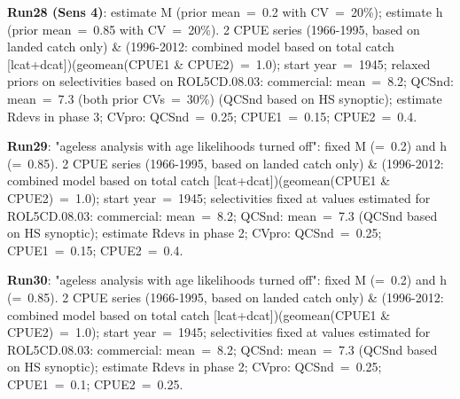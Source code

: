 {\bf Run28 (Sens 4)}: estimate M (prior mean~=~0.2 with CV~=~20\%); estimate h (prior mean~=~0.85 with CV~=~20\%). 2 CPUE series (1966-1995, based on landed catch only) \& (1996-2012: combined model based on total catch [lcat+dcat])(geomean(CPUE1 \& CPUE2)~=~1.0); start year~=~1945; relaxed priors on selectivities based on ROL5CD.08.03: commercial: mean~=~8.2; QCSnd: mean~=~7.3 (both prior CVs~=~30\%) (QCSnd based on HS synoptic); estimate Rdevs in phase 3; CVpro: QCSnd~=~0.25; CPUE1~=~0.15; CPUE2~=~0.4. \newline

{\bf Run29}: "ageless analysis with age likelihoods turned off": fixed M (=~0.2) and h (=~0.85). 2 CPUE series (1966-1995, based on landed catch only) \& (1996-2012: combined model based on total catch [lcat+dcat])(geomean(CPUE1 \& CPUE2)~=~1.0); start year~=~1945; selectivities fixed at values estimated for ROL5CD.08.03: commercial: mean~=~8.2; QCSnd: mean~=~7.3 (QCSnd based on HS synoptic); estimate Rdevs in phase 2; CVpro: QCSnd~=~0.25; CPUE1~=~0.15; CPUE2~=~0.4. \newline

{\bf Run30}: "ageless analysis with age likelihoods turned off": fixed M (=~0.2) and h (=~0.85). 2 CPUE series (1966-1995, based on landed catch only) \& (1996-2012: combined model based on total catch [lcat+dcat])(geomean(CPUE1 \& CPUE2)~=~1.0); start year~=~1945; selectivities fixed at values estimated for ROL5CD.08.03: commercial: mean~=~8.2; QCSnd: mean~=~7.3 (QCSnd based on HS synoptic); estimate Rdevs in phase 2; CVpro: QCSnd~=~0.25; CPUE1~=~0.1; CPUE2~=~0.25. \newline


